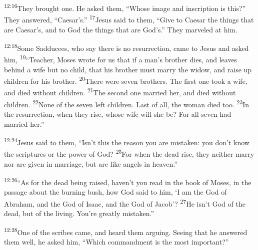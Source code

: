 \documentclass[openany,12pt,english]{book}
\newenvironment{para}{\par\pretolerance=100\tolerance=200\setlength{\emergencystretch}{0.6em}\relax}{\par}
\begin{document}
\begin{para}
    \textsuperscript{12:16}\thinspace{}They brought one. He asked them, “Whose im\-age and in\-scrip\-tion is this?” They answered, “Caesar's.”
    \textsuperscript{17}\thinspace{}Jesus said to them, “Give to Caesar the things that are Caesar's, and to God the things that are God's.” They mar\-veled at him.
\end{para}

\bigskip{}

\begin{para}
    \textsuperscript{12:18}\thinspace{}Some Sadducees, who say there is no res\-ur\-rec\-tion, came to Jesus and asked him,
    \textsuperscript{19}\thinspace{}“Teach\-er, Mo\-ses wrote for us that if a man's broth\-er dies, and leaves be\-hind a wife but no child, that his broth\-er must mar\-ry the wid\-ow, and raise up chil\-dren for his broth\-er.
    \textsuperscript{20}\thinspace{}There were sev\-en brothers. The first one took a wife, and died with\-out chil\-dren.
    \textsuperscript{21}\thinspace{}The second one mar\-ried her, and died with\-out chil\-dren.
    \textsuperscript{22}\thinspace{}None of the sev\-en left chil\-dren. Last of all, the wom\-an died too.
    \textsuperscript{23}\thinspace{}In the res\-ur\-rec\-tion, when they rise, whose wife will she be? For all sev\-en had mar\-ried her.”
\end{para}

\begin{para}
    \textsuperscript{12:24}\thinspace{}Jesus said to them, “Is\-n't this the rea\-son you are mis\-tak\-en: you don't know the scriptures or the pow\-er of God?
    \textsuperscript{25}\thinspace{}For when the dead rise, they nei\-ther mar\-ry nor are giv\-en in mar\-riage, but are like angels in heav\-en.”
\end{para}

\begin{para}
    \textsuperscript{12:26}\thinspace{}“As for the dead be\-ing raised, have\-n't you read in the book of Mo\-ses, in the pas\-sage a\-bout the burn\-ing bush, how God said to him, ‘I am the God of Abraham, and the God of Isaac, and the God of Jacob’?
    \textsuperscript{27}\thinspace{}He is\-n't God of the dead, but of the liv\-ing. You're great\-ly mis\-tak\-en.”
\end{para}

\begin{para}
    \textsuperscript{12:28}\thinspace{}One of the scribes came, and heard them ar\-gu\-ing. See\-ing that he answered them well, he asked him, “Which com\-mand\-ment is the most im\-por\-tant?”
\end{para}
\end{document}
